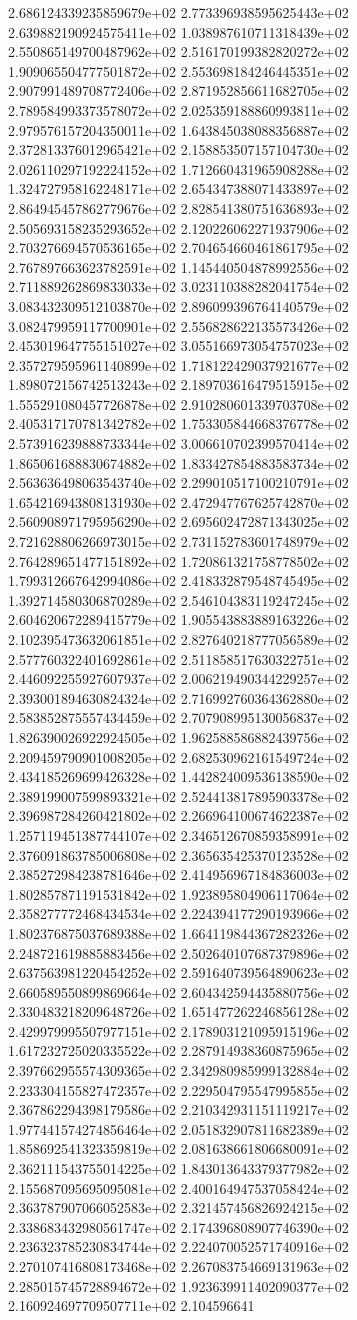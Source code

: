 2.686124339235859679e+02	2.773396938595625443e+02	2.639882190924575411e+02	1.038987610711318439e+02	2.550865149700487962e+02	2.516170199382820272e+02	1.909065504777501872e+02	2.553698184246445351e+02	2.907991489708772406e+02	2.871952856611682705e+02	2.789584993373578072e+02	2.025359188860993811e+02	2.979576157204350011e+02	1.643845038088356887e+02	2.372813376012965421e+02	2.158853507157104730e+02	2.026110297192224152e+02	1.712660431965908288e+02	1.324727958162248171e+02	2.654347388071433897e+02	2.864945457862779676e+02	2.828541380751636893e+02	2.505693158235293652e+02	2.120226062271937906e+02	2.703276694570536165e+02	2.704654660461861795e+02	2.767897663623782591e+02	1.145440504878992556e+02	2.711889262869833033e+02	3.023110388282041754e+02	3.083432309512103870e+02	2.896099396764140579e+02	3.082479959117700901e+02	2.556828622135573426e+02	2.453019647755151027e+02	3.055166973054757023e+02	2.357279595961140899e+02	1.718122429037921677e+02	1.898072156742513243e+02	2.189703616479515915e+02	1.555291080457726878e+02	2.910280601339703708e+02	2.405317170781342782e+02	1.753305844668376778e+02	2.573916239888733344e+02	3.006610702399570414e+02	1.865061688830674882e+02	1.833427854883583734e+02	2.563636498063543740e+02	2.299010517100210791e+02	1.654216943808131930e+02	2.472947767625742870e+02	2.560908971795956290e+02	2.695602472871343025e+02	2.721628806266973015e+02	2.731152783601748979e+02	2.764289651477151892e+02	1.720861321758778502e+02	1.799312667642994086e+02	2.418332879548745495e+02	1.392714580306870289e+02	2.546104383119247245e+02	2.604620672289415779e+02	1.905543883889163226e+02	2.102395473632061851e+02	2.827640218777056589e+02	2.577760322401692861e+02	2.511858517630322751e+02	2.446092255927607937e+02	2.006219490344229257e+02	2.393001894630824324e+02	2.716992760364362880e+02	2.583852875557434459e+02	2.707908995130056837e+02	1.826390026922924505e+02	1.962588586882439756e+02	2.209459790901008205e+02	2.682530962161549724e+02	2.434185269699426328e+02	1.442824009536138590e+02	2.389199007599893321e+02	2.524413817895903378e+02	2.396987284260421802e+02	2.266964100674622387e+02	1.257119451387744107e+02	2.346512670859358991e+02	2.376091863785006808e+02	2.365635425370123528e+02	2.385272984238781646e+02	2.414956967184836003e+02	1.802857871191531842e+02	1.923895804906117064e+02	2.358277772468434534e+02	2.224394177290193966e+02	1.802376875037689388e+02	1.664119844367282326e+02	2.248721619885883456e+02	2.502640107687379896e+02	2.637563981220454252e+02	2.591640739564890623e+02	2.660589550899869664e+02	2.604342594435880756e+02	2.330483218209648726e+02	1.651477262246856128e+02	2.429979995507977151e+02	2.178903121095915196e+02	1.617232725020335522e+02	2.287914938360875965e+02	2.397662955574309365e+02	2.342980985999132884e+02	2.233304155827472357e+02	2.229504795547995855e+02	2.367862294398179586e+02	2.210342931151119217e+02	1.977441574274856464e+02	2.051832907811682389e+02	1.858692541323359819e+02	2.081638661806680091e+02	2.362111543755014225e+02	1.843013643379377982e+02	2.155687095695095081e+02	2.400164947537058424e+02	2.363787907066052583e+02	2.321457456826924215e+02	2.338683432980561747e+02	2.174396808907746390e+02	2.236323785230834744e+02	2.224070052571740916e+02	2.270107416808173468e+02	2.267083754669131963e+02	2.285015745728894672e+02	1.923639911402090377e+02	2.160924697709507711e+02	2.104596641